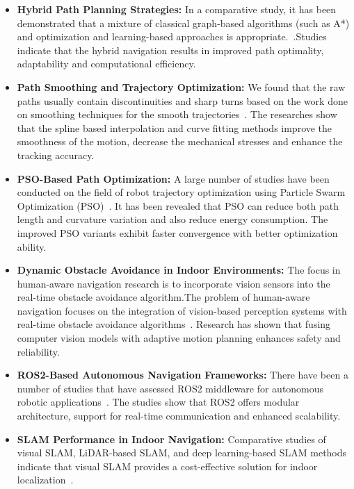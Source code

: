 \begin{itemize}
\item \textbf{Hybrid Path Planning Strategies:} In a comparative study, it has been demonstrated that a mixture of classical graph-based algorithms (such as A*) and optimization and learning-based approaches is appropriate.~\cite{ajeil2020grid}.Studies indicate that the hybrid navigation results in improved path optimality, adaptability and computational efficiency.
\item \textbf{Path Smoothing and Trajectory Optimization:}  We found that the raw paths usually contain discontinuities and sharp turns based on the work done on smoothing techniques for the smooth trajectories~\cite{ravankar2018path}. The researches show that the spline based interpolation and curve fitting methods improve the smoothness of the motion, decrease the mechanical stresses and enhance the tracking accuracy.
\item \textbf{PSO-Based Path Optimization:} A large number of studies have been conducted on the field of robot trajectory optimization using Particle Swarm Optimization (PSO)~\cite{song2020smooth}. It has been revealed that PSO can reduce both path length and curvature variation and also reduce energy consumption. The improved PSO variants exhibit faster convergence with better optimization ability.

\item \textbf{Dynamic Obstacle Avoidance in Indoor Environments:} The focus in human-aware navigation research is to incorporate vision sensors into the real-time obstacle avoidance algorithm.The problem of human-aware navigation focuses on the integration of vision-based perception systems with real-time obstacle avoidance algorithms~\cite{kumar2024real}. Research has shown that fusing computer vision models with adaptive motion planning enhances safety and reliability.

\item \textbf{ROS2-Based Autonomous Navigation Frameworks:} There have been a number of studies that have assessed ROS2 middleware for autonomous robotic applications~\cite{hwang2023ros2}. The studies show that ROS2 offers modular architecture, support for real-time communication and enhanced scalability.

\item \textbf{SLAM Performance in Indoor Navigation:} Comparative studies of visual SLAM, LiDAR-based SLAM, and deep learning-based SLAM methods indicate that visual SLAM provides a cost-effective solution for indoor localization~\cite{rosinol2020kimera}.


\end{itemize}
